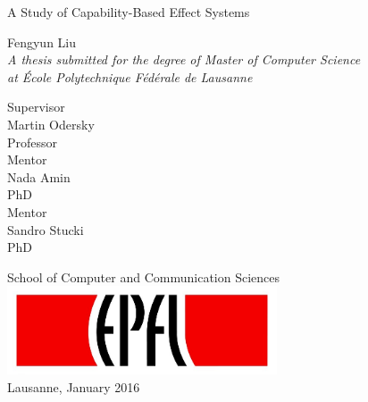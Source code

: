 \begin{titlepage}

  \begin{center}

    \vspace*{3\baselineskip}
    {\LARGE A Study of Capability-Based Effect Systems\\[2cm] }

    \noindent
    Fengyun Liu \\[2cm]

    \noindent
    \emph{A thesis submitted for the degree of Master of Computer
      Science \\
    at École Polytechnique Fédérale de Lausanne} \\[1.8cm]

    \noindent
    \begin{multicols}{3}
    Supervisor \\
    Martin Odersky \\
    Professor \\
    \vfill
    \columnbreak
    Mentor \\
    Nada Amin \\
    PhD \\
    \vfill
    \columnbreak
    Mentor \\
    Sandro Stucki\\
    PhD \\
    \end{multicols}

    \vspace*{3\baselineskip}

    \noindent
    {School of Computer and Communication Sciences \\[1cm]}
    \includegraphics[width=0.6\textwidth]{img/epfl}~\\[1cm]
    \noindent
    Lausanne, January 2016 \\[1cm]



  \end{center}

\end{titlepage}
